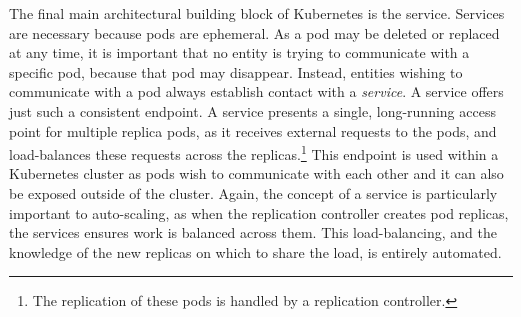 The final main architectural building block of Kubernetes is the service.
Services are necessary because pods are ephemeral. As a pod may be deleted or
replaced at any time, it is important that no entity is trying to communicate
with a specific pod, because that pod may disappear. Instead, entities wishing to
communicate with a pod always establish contact with a \textit{service}.
A service offers just such a consistent endpoint. A service presents a
single, long-running access point for multiple replica pods, as it receives
external requests to the pods, and load-balances
these requests across the replicas.\footnote{The replication of
these pods is handled by a replication controller.} This endpoint is used within
a Kubernetes cluster as pods wish to communicate with each other and it can also
be exposed outside of the cluster. Again, the concept of a service is
particularly important to auto-scaling, as when the replication
controller creates pod replicas, the services ensures work is balanced across
them. This load-balancing, and the knowledge of the new replicas on which to
share the load, is entirely automated.\cite{k8s-services}
